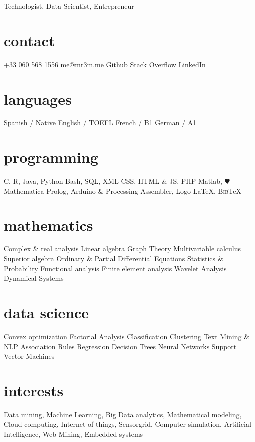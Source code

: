 \documentclass[]{friggeri-cv}
\begin{document}
       {Technologist, Data Scientist, Entrepreneur}


\begin{aside}
  \section{contact}
    +33 060 568 1556
    \href{mailto:me@mr3m.me}{me@mr3m.me}
    \href{https://github.com/mr3m}{Github}
    \href{http://stackoverflow.com/cv/mr3m}{Stack Overflow}
    \href{https://fr.linkedin.com/in/carloslopezroa}{LinkedIn}
  \section{languages}
    Spanish / Native
    English / TOEFL
    French / B1
    German / A1
  \section{	programming}
    C, R, Java, Python
    Bash, SQL, XML
    CSS, HTML \& JS, PHP
    Matlab, {\color{red} $\varheartsuit$} Mathematica
    Prolog, %
    Arduino \& Processing
    Assembler, Logo
    \LaTeX{}, B\textsc{ib}\TeX{}
   \section{mathematics}  
   Complex \& real analysis
   Linear algebra
   Graph Theory
   Multivariable calculus
   Superior algebra
   Ordinary \& Partial Differential Equations
   Statistics \& Probability
   Functional analysis
   Finite element analysis
   Wavelet Analysis
   Dynamical Systems
   \section{data science}
   Convex optimization
   Factorial Analysis
   Classification
   Clustering
   Text Mining \& NLP
   Association Rules
   Regression
   Decision Trees
   Neural Networks
   Support Vector Machines
\end{aside}

\section{interests}

Data mining, Machine Learning, Big Data analytics, Mathematical modeling, Cloud computing, Internet of things, Sensorgrid,  Computer simulation,   Artificial Intelligence, Web Mining, Embedded systems
\end{document}
